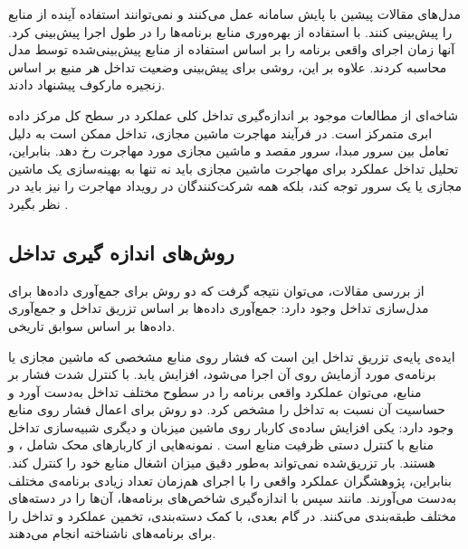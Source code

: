 مدل‌های مقالات پیشین با پایش سامانه عمل می‌کنند و نمی‌توانند استفاده آینده از منابع را پیش‌بینی کنند. \cite{Barve2019FECBench} با استفاده از  بهره‌وری منابع برنامه‌ها را در طول اجرا پیش‌بینی کرد. آنها زمان اجرای واقعی برنامه را بر اساس استفاده از منابع پیش‌بینی‌شده توسط مدل محاسبه کردند. علاوه بر این، \cite{Chen2015CloudScope} روشی برای پیش‌بینی وضعیت تداخل هر منبع بر اساس زنجیره مارکوف پیشنهاد دادند.

شاخه‌ای از مطالعات موجود بر اندازه‌گیری تداخل کلی عملکرد در سطح کل مرکز داده ابری متمرکز است. در فرآیند مهاجرت ماشین مجازی، تداخل ممکن است به دلیل تعامل بین سرور مبدا، سرور مقصد و ماشین مجازی مورد مهاجرت رخ دهد. بنابراین، تحلیل تداخل عملکرد برای مهاجرت ماشین مجازی باید نه تنها به بهینه‌سازی یک ماشین مجازی یا یک سرور توجه کند، بلکه همه شرکت‌کنندگان در رویداد مهاجرت را نیز باید در نظر بگیرد \cite{Xu2014iAware, Shaw2019Energy}.

\subsection{روش‌های اندازه گیری تداخل}

از بررسی مقالات، می‌توان نتیجه گرفت که دو روش برای جمع‌آوری داده‌ها برای مدل‌سازی تداخل وجود دارد: جمع‌آوری داده‌ها بر اساس تزریق تداخل و جمع‌آوری داده‌ها بر اساس سوابق تاریخی.

ایده‌ی پایه‌ی تزریق تداخل این است که فشار روی منابع مشخصی که ماشین مجازی یا برنامه‌ی مورد آزمایش روی آن اجرا می‌شود، افزایش یابد. با کنترل شدت فشار بر منابع، می‌توان عملکرد واقعی برنامه را در سطوح مختلف تداخل به‌دست آورد و حساسیت آن نسبت به تداخل را مشخص کرد. دو روش برای اعمال فشار روی منابع وجود دارد: یکی افزایش ساده‌ی کاربار روی ماشین میزبان و دیگری شبیه‌سازی تداخل منابع با کنترل دستی ظرفیت منابع است \cite{Taheri2017vmBBProfiler}. نمونه‌هایی از کاربارهای محک شامل \cite{Delimitrou2013iBench}، \cite{Mars2011CrossCore} و \cite{Govindan2011Cuanta} هستند. بار تزریق‌شده نمی‌تواند به‌طور دقیق میزان اشغال منابع خود را کنترل کند. بنابراین، پژوهشگران عملکرد واقعی را با اجرای هم‌زمان تعداد زیادی برنامه‌ی مختلف به‌دست می‌آورند. مانند \cite{Barve2019FECBench} سپس با اندازه‌گیری شاخص‌های برنامه‌ها، آن‌ها را در دسته‌های مختلف طبقه‌بندی می‌کنند. در گام بعدی، با کمک دسته‌بندی، تخمین عملکرد و تداخل را برای برنامه‌های ناشناخته انجام می‌دهند.

